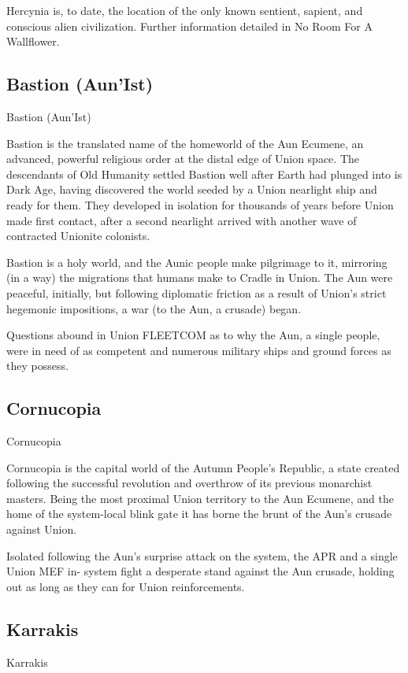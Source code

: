 Hercynia is, to date, the location of the only known sentient, sapient, and conscious alien
civilization. Further information detailed in No Room For A Wallflower.

\subsection{Bastion (Aun’Ist)}
Bastion (Aun’Ist)

Bastion is the translated name of the homeworld of the Aun Ecumene, an advanced, powerful
religious order at the distal edge of Union space. The descendants of Old Humanity settled
Bastion well after Earth had plunged into is Dark Age, having discovered the world seeded by a
Union nearlight ship and ready for them. They developed in isolation for thousands of years
before Union made first contact, after a second nearlight arrived with another wave of contracted
Unionite colonists.


Bastion is a holy world, and the Aunic people make pilgrimage to it, mirroring (in a way) the
migrations that humans make to Cradle in Union. The Aun were peaceful, initially, but following
diplomatic friction as a result of Union’s strict hegemonic impositions, a war (to the Aun, a
crusade) began.


Questions abound in Union FLEETCOM as to why the Aun, a single people, were in need of as
competent and numerous military ships and ground forces as they possess.

\subsection{Cornucopia}
Cornucopia

Cornucopia is the capital world of the Autumn People’s Republic, a state created following the
successful revolution and overthrow of its previous monarchist masters. Being the most proximal
Union territory to the Aun Ecumene, and the home of the system-local blink gate it has borne the
brunt of the Aun’s crusade against Union.


Isolated following the Aun’s surprise attack on the system, the APR and a single Union MEF in-
system fight a desperate stand against the Aun crusade, holding out as long as they can for
Union reinforcements.

\subsection{Karrakis}
Karrakis

